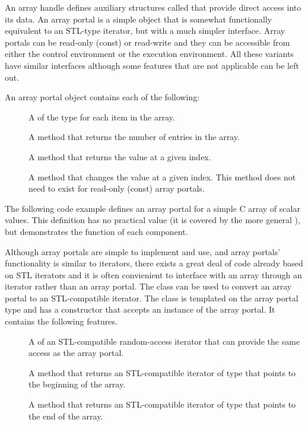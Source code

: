 An array handle defines auxiliary structures called 
that provide direct access into its data. An array portal is a simple
object that is somewhat functionally equivalent to an STL-type iterator, but
with a much simpler interface. Array portals can be read-only (const) or
read-write and they can be accessible from either the control environment
or the execution environment. All these variants have similar interfaces
although some features that are not applicable can be left out.

An array portal object contains each of the following:
\begin{description}
\item[] A  of the type for each item
  in the array.
\item[] A method that returns the number of
  entries in the array.
\item[] A method that returns the value at a given index.
\item[] A method that changes the value at a given
  index. This method does not need to exist for read-only (const) array
  portals.
\end{description}

The following code example defines an array portal for a simple C array of
scalar values. This definition has no practical value (it is covered by the
more general ), but demonstrates
the function of each component.


Although array portals are simple to implement and use, and array portals'
functionality is similar to iterators, there exists a great deal of code
already based on STL iterators and it is often convienient to interface
with an array through an iterator rather than an array portal. The
 class can be used to convert an array
portal to an STL-compatible iterator. The class is templated on the array
portal type and has a constructor that accepts an instance of the array
portal. It contains the following features.
\begin{description}
\item[] A  of an STL-compatible
  random-access iterator that can provide the same access as the array
  portal.
\item[] A method that returns an STL-compatible iterator
  of type  that points to the beginning of the
  array.
\item[] A method that returns an STL-compatible iterator
  of type  that points to the end of the array.
\end{description}

